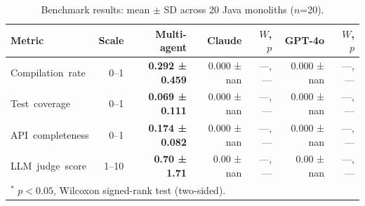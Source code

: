 
\begin{table}[ht]
\centering
\caption{Benchmark results: mean $\pm$ SD across 20 Java monoliths ($n$=20).}
\label{tab:results}
\begin{tabular}{lrrrrrr}
\toprule
\textbf{Metric} & \textbf{Scale} & \textbf{Multi-agent} & \textbf{Claude} & $W$, $p$ & \textbf{GPT-4o} & $W$, $p$ \\
\midrule
Compilation~rate & 0–1 & \textbf{0.292 ± 0.459} & 0.000 ± nan & —, — & 0.000 ± nan & —, — \\
Test~coverage & 0–1 & \textbf{0.069 ± 0.111} & 0.000 ± nan & —, — & 0.000 ± nan & —, — \\
API~completeness & 0–1 & \textbf{0.174 ± 0.082} & 0.000 ± nan & —, — & 0.000 ± nan & —, — \\
LLM~judge~score & 1–10 & \textbf{0.70 ± 1.71} & 0.00 ± nan & —, — & 0.00 ± nan & —, — \\
\bottomrule
\multicolumn{7}{l}{\small $^*$ $p < 0.05$, Wilcoxon signed-rank test (two-sided).}
\end{tabular}
\end{table}
